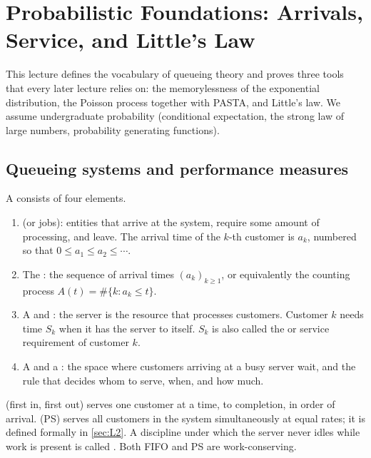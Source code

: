\chapter{Probabilistic Foundations: Arrivals, Service, and Little's Law}\label{sec:L1}

This lecture defines the vocabulary of queueing theory and proves three tools that
every later lecture relies on: the memorylessness of the exponential distribution,
the Poisson process together with PASTA, and Little's law. We assume undergraduate
probability (conditional expectation, the strong law of large numbers, probability
generating functions).

\section{Queueing systems and performance measures}

\begin{definition}\label{L1:def:system}
A  consists of four elements.
\begin{enumerate}
\item {} (or jobs): entities that arrive at the system, require some
  amount of processing, and leave. The arrival time of the $k$-th customer is $a_k$,
  numbered so that $0\le a_1\le a_2\le\cdots$.
\item The : the sequence of arrival times $(a_k)_{k\ge1}$, or
  equivalently the counting process $A(t)=\#\{k: a_k\le t\}$.
\item A  and : the server is the resource that
  processes customers. Customer $k$ needs time $S_k$ when it has the server to
  itself. $S_k$ is also called the  or service requirement of customer $k$.
\item A  and a : the space where customers
  arriving at a busy server wait, and the rule that decides whom to serve, when, and
  how much.
\end{enumerate}
\end{definition}

\begin{definition}\label{L1:def:discipline}
 (first in, first out) serves one customer at a time, to completion, in
order of arrival.  (PS) serves all customers in the system
simultaneously at equal rates; it is defined formally in \cref{sec:L2}.
A discipline under which the server never idles while work is present is called
. Both FIFO and PS are work-conserving.
\end{definition}

